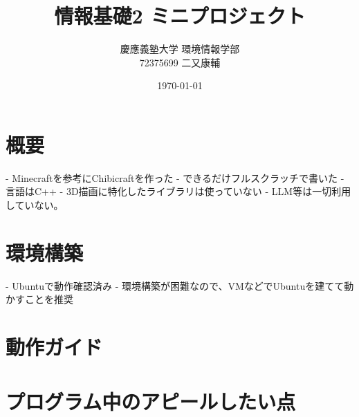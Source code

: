 \documentclass[dvipdfmx]{jsarticle}
\title{情報基礎2 ミニプロジェクト}
\author{
    慶應義塾大学 環境情報学部 \\
    72375699 二又康輔
}
\date{\today}
\begin{document}
\maketitle

\section{概要}
- Minecraftを参考にChibicraftを作った
- できるだけフルスクラッチで書いた
- 言語はC++
- 3D描画に特化したライブラリは使っていない
- LLM等は一切利用していない。

\section{環境構築}
- Ubuntuで動作確認済み
- 環境構築が困難なので、VMなどでUbuntuを建てて動かすことを推奨

\section{動作ガイド}

\section{プログラム中のアピールしたい点}
\end{document}
